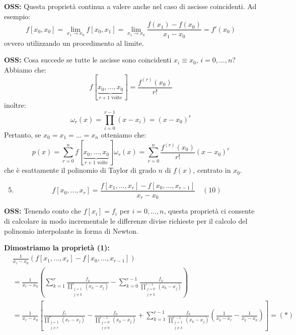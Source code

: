 \textbf{OSS:} Questa proprietà continua a valere anche nel caso di ascisse coincidenti. Ad esempio:
$$f[x_0, x_0] = \lim_{x_1 \to x_0} f[x_0, x_1] = \lim_{x_1 \to x_0} \frac{f(x_1)-f(x_0)}{x_1-x_0} = f'(x_0)$$
ovvero utilizzando un procedimento al limite.

\textbf{OSS:} Cosa succede se tutte le ascisse sono coincidenti $x_i \equiv x_0$, $i=0,\dots,n$?
Abbiamo che:
$$f[\underbrace{x_0, \dots, x_0}_{r+1 \text{ volte}}] = \frac{f^{(r)}(x_0)}{r!}$$
inoltre:
$$\omega_r(x) = \prod_{i=0}^{r-1}(x-x_i) = (x-x_0)^r$$
Pertanto, se $x_0 = x_1 = \dots = x_n$ otteniamo che:
$$p(x) = \sum_{r=0}^{n} f[\underbrace{x_0, \dots, x_0}_{r+1 \text{ volte}}] \omega_r(x) = \sum_{r=0}^{n} \frac{f^{(r)}(x_0)}{r!} (x-x_0)^r$$
che è esattamente il polinomio di Taylor di grado $n$ di $f(x)$, centrato in $x_0$.

\vspace{0.5cm}
\begin{enumerate}
    \setcounter{enumi}{4}
    \item $$f[x_0, \dots, x_r] = \frac{f[x_1, \dots, x_r] - f[x_0, \dots, x_{r-1}]}{x_r - x_0} \quad (10)$$
\end{enumerate}

\textbf{OSS:} Tenendo conto che $f[x_i] = f_i$ per $i=0,\dots,n$, questa proprietà ci consente di calcolare in modo incrementale le differenze divise richieste per il calcolo del polinomio interpolante in forma di Newton.

\vspace{0.5cm}
\textbf{Dimostriamo la proprietà (1):}
\begin{align*}
    &\frac{1}{x_r-x_0} \left( f[x_1, \dots, x_r] - f[x_0, \dots, x_{r-1}] \right) \\
    &= \frac{1}{x_r-x_0} \left( \sum_{k=1}^{r} \frac{f_k}{\prod_{\substack{j=1 \\ j \neq k}}^{r}(x_k-x_j)} - \sum_{k=0}^{r-1} \frac{f_k}{\prod_{\substack{j=0 \\ j \neq k}}^{r-1}(x_k-x_j)} \right) \\
    &= \frac{1}{x_r-x_0} \left[ \frac{f_r}{\prod_{\substack{j=1 \\ j \neq r}}^{r}(x_r-x_j)} - \frac{f_0}{\prod_{\substack{j=0 \\ j \neq 0}}^{r-1}(x_0-x_j)} + \sum_{k=1}^{r-1} \frac{f_k}{\prod_{\substack{j=1 \\ j \neq k}}^{r-1}(x_k-x_j)} \left( \frac{1}{x_k-x_r} - \frac{1}{x_k-x_0} \right) \right] = (*)
\end{align*}


